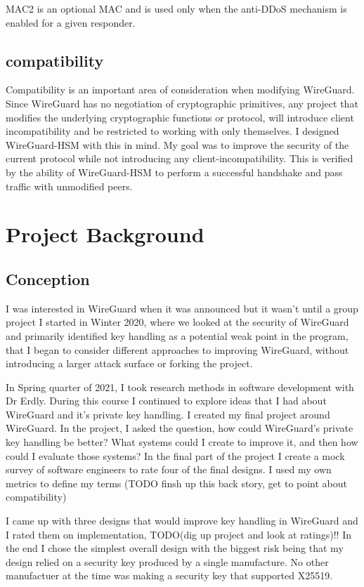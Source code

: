 \documentclass [11pt, proquest] {uwthesis}[2020/02/24]
\begin{document}
MAC2 is an optional MAC and is used only when the anti-DDoS mechanism is enabled for a given responder. 

\section{compatibility}
Compatibility is an important area of consideration when modifying WireGuard. Since WireGuard has no negotiation of cryptographic primitives, any project that modifies the underlying cryptographic functions or protocol, will introduce client incompatibility and be restricted to working with only themselves. I designed WireGuard-HSM with this in mind. My goal was to improve the security of the current protocol while not introducing any client-incompatibility. This is verified by the ability of WireGuard-HSM to perform a successful handshake and pass traffic with unmodified peers.


\chapter {Project Background}

\section {Conception}
I was interested in WireGuard when it was announced but it wasn't until a group project I started in Winter 2020, where we looked at the security of WireGuard and primarily identified key handling as a potential weak point in the program, that I began to consider different approaches to improving WireGuard,  without introducing a larger attack surface or forking the project. 

In Spring quarter of 2021, I took research methods in software development with Dr Erdly. During this course I continued to explore ideas that I had about WireGuard and it's private key handling. I created my final project around WireGuard. In the project, I asked the question, how could WireGuard's private key handling be better? What systems could I create to improve it, and then how could I evaluate those systems?  
In the final part of the project I create a mock survey of software engineers to rate four of the final designs. I used my own metrics to define my terms (TODO finsh up this back story, get to point about compatibility)

I came up with three designs that would improve key handling in WireGuard and I rated them on implementation, TODO(dig up project and look at ratings)!! In the end I chose the simplest overall design with the biggest risk being that my design relied on a security key produced by a single manufacture. No other manufactuer at the time was making a security key that supported X25519.
\end{document}

